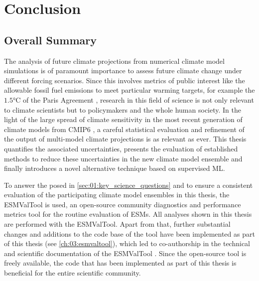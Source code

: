 


\chapter{Conclusion}
\label{ch:07:conclusion}


\section{Overall Summary}
\label{sec:07:overall_summary}

The analysis of future climate projections from numerical climate model
simulations is of paramount importance to assess future climate change under
different forcing scenarios. Since this involves metrics of public interest
like the allowable fossil fuel emissions to meet particular warming targets,
for example the $1.5 \unit{\degreeCelsius}$ of the Paris Agreement
\autocite{UNFCCC2015}, research in this field of science is not only relevant
to climate scientists but to policymakers and the whole human society. In the
light of the large spread of climate sensitivity in the most recent generation
of climate models from \acs{CMIP}6 \autocite{Meehl2020}, a careful statistical
evaluation and refinement of the output of multi-model climate projections is
as relevant as ever. This thesis quantifies the associated uncertainties,
presents the evaluation of established methods to reduce these uncertainties in
the new climate model ensemble and finally introduces a novel alternative
technique based on supervised \ac{ML}.

To answer the  posed in
\cref{sec:01:key_science_questions} and to ensure a consistent evaluation of
the participating climate model ensembles in this thesis, the \ac{ESMValTool}
is used, an open-source community diagnostics and performance metrics tool for
the routine evaluation of \acp{ESM}. All analyses shown in this thesis are
performed with the \ac{ESMValTool}. Apart from that, further substantial
changes and additions to the code base of the tool have been implemented as
part of this thesis (see \cref{ch:03:esmvaltool}), which led to co-authorship
in the technical and scientific documentation of the \ac{ESMValTool}
\autocite{Eyring2020, Lauer2020, Righi2020, Weigel2020}. Since the open-source
tool is freely available, the code that has been implemented as part of this
thesis is beneficial for the entire scientific community.

